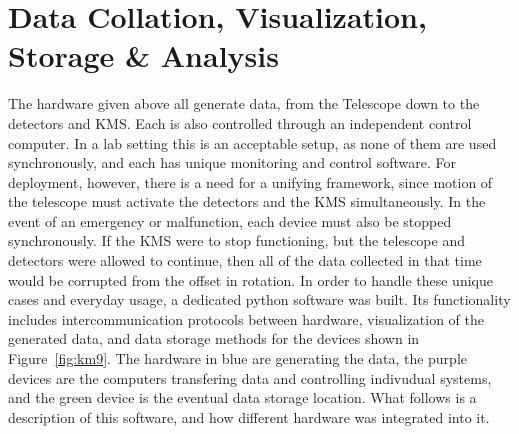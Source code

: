 \documentclass[manuscript]{aastex}
\begin{document}
\newpage
\section{\textbf{Data Collation, Visualization, Storage \& Analysis}}
The hardware given above all generate data, from the Telescope down to the detectors and KMS. Each is also controlled through an independent control computer. In a lab setting this is an acceptable setup, as none of them are used synchronously, and each has unique monitoring and control software. For deployment, however, there is a need for a unifying framework, since motion of the telescope must activate the detectors and the KMS simultaneously. In the event of an emergency or malfunction, each device must also be stopped synchronously. If the KMS were to stop functioning, but the telescope and detectors were allowed to continue, then all of the data collected in that time would be corrupted from the offset in rotation. In order to handle these unique cases and everyday usage, a dedicated python software was built. Its functionality includes intercommunication protocols between hardware, visualization of the generated data, and data storage methods for the devices shown in Figure~\ref{fig:km9}. The hardware in blue are generating the data, the purple devices are the computers transfering data and controlling indivudual systems, and the green device is the eventual data storage location. What follows is a description of this software, and how different hardware was integrated into it.
\end{document}
